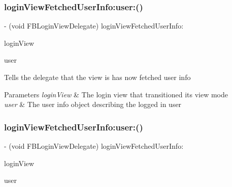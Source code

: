 \subsubsection{\texorpdfstring{login\+View\+Fetched\+User\+Info\+:user\+:()}{loginViewFetchedUserInfo:user:()}\hspace{0.1cm}{\footnotesize\ttfamily [4/5]}}
{\footnotesize\ttfamily -\/ (void F\+B\+Login\+View\+Delegate) login\+View\+Fetched\+User\+Info\+: \begin{DoxyParamCaption}\item[{(\hyperlink{interfaceFBLoginView}{F\+B\+Login\+View} $\ast$)}]{login\+View }\item[{user:(id$<$ \hyperlink{protocolFBGraphUser-p}{F\+B\+Graph\+User} $>$)}]{user }\end{DoxyParamCaption}\hspace{0.3cm}{\ttfamily [optional]}}

Tells the delegate that the view is has now fetched user info


\begin{DoxyParams}{Parameters}
{\em login\+View} & The login view that transitioned its view mode\\
\hline
{\em user} & The user info object describing the logged in user \\
\hline
\end{DoxyParams}
\mbox{\label{protocolFBLoginViewDelegate_01-p_a6dfcb82e159aa83b726797ec2de6877c}} 
\subsubsection{\texorpdfstring{login\+View\+Fetched\+User\+Info\+:user\+:()}{loginViewFetchedUserInfo:user:()}\hspace{0.1cm}{\footnotesize\ttfamily [5/5]}}
{\footnotesize\ttfamily -\/ (void F\+B\+Login\+View\+Delegate) login\+View\+Fetched\+User\+Info\+: \begin{DoxyParamCaption}\item[{(\hyperlink{interfaceFBLoginView}{F\+B\+Login\+View} $\ast$)}]{login\+View }\item[{user:(id$<$ \hyperlink{protocolFBGraphUser-p}{F\+B\+Graph\+User} $>$)}]{user }\end{DoxyParamCaption}\hspace{0.3cm}{\ttfamily [optional]}}

